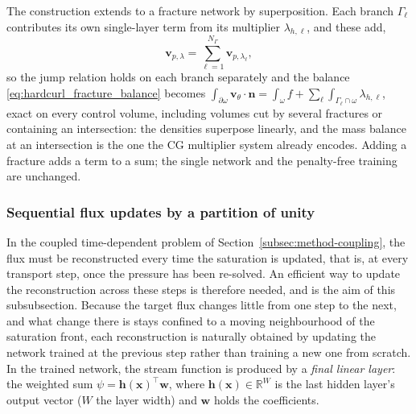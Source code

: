 \documentclass[a4paper,fleqn]{cas-sc}
\newcommand{\vflux}{\mathbf{v}}
\begin{document}
The construction extends to a fracture network by superposition. Each branch
\(\Gamma_\ell\) contributes its own single-layer term from its multiplier
\(\lambda_{h,\ell}\), and these add,
\begin{equation}
  \vflux_{p,\lambda}=\sum_{\ell=1}^{N_\Gamma}\vflux_{p,\lambda_\ell} ,
  \label{eq:multi_fracture_source}
\end{equation}
so the jump relation holds on each branch separately and the balance
\eqref{eq:hardcurl_fracture_balance} becomes
\(\int_{\partial\omega}\vflux_\theta\cdot\mathbf{n}
=\int_\omega f+\sum_\ell\int_{\Gamma_\ell\cap\omega}\lambda_{h,\ell}\),
exact on every control volume, including volumes cut by several fractures or
containing an intersection: the densities superpose linearly, and the mass
balance at an intersection is the one the CG multiplier system already encodes.
Adding a fracture adds a term to a sum; the single network and the penalty-free
training are unchanged.

\subsubsection{Sequential flux updates by a partition of unity}
\label{subsubsec:pou-head}

In the coupled time-dependent problem of Section~\ref{subsec:method-coupling},
the flux must be reconstructed every time the saturation is updated, that is, at
every transport step, once the pressure has been re-solved. An efficient way to
update the reconstruction across these steps is therefore needed, and is the aim
of this subsubsection. Because the target flux changes little from
one step to the next, and what change there is stays confined to a moving
neighbourhood of the saturation front, each reconstruction is naturally
obtained by updating the network trained at the previous step rather than
training a new one from scratch. In the trained network, the stream function is
produced by a \emph{final linear layer}: the weighted sum
\(\psi=\mathbf{h}(\mathbf{x})^{\!\top}\mathbf{w}\), where
\(\mathbf{h}(\mathbf{x})\in\mathbb{R}^{W}\) is the last hidden layer's output
vector (\(W\) the layer width) and \(\mathbf{w}\) holds the coefficients.
\end{document}
